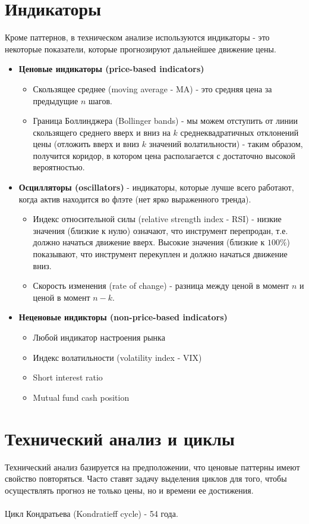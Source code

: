\documentclass{article}
\begin{document}
\section{Индикаторы}
Кроме паттернов, в техническом анализе используются индикаторы - это некоторые показатели, которые прогнозируют дальнейшее движение цены.
\begin{itemize}
    \item \textbf{Ценовые индикаторы (price-based indicators)}
    \begin{itemize}
        \item Скользящее среднее (moving average - MA) - это средняя цена за предыдущие $n$ шагов.
        \item Граница Боллинджера (Bollinger bands) - мы можем отступить от линии скользящего среднего вверх и вниз на $k$ среднеквадратичных отклонений цены (отложить вверх и вниз $k$ значений волатильности) - таким образом, получится коридор, в котором цена располагается с достаточно высокой вероятностью.
    \end{itemize}
    \item \textbf{Осцилляторы (oscillators)} - индикаторы, которые лучше всего работают, когда актив находится во флэте (нет ярко выраженного тренда).
    \begin{itemize}
        \item Индекс относительной силы (relative strength index - RSI) - низкие значения (близкие к нулю) означают, что инструмент перепродан, т.е. должно начаться движение вверх. Высокие значения (близкие к $100\%$) показывают, что инструмент перекуплен и должно начаться движение вниз.
        \item Скорость изменения (rate of change) - разница между ценой в момент $n$ и ценой в момент $n - k$.
    \end{itemize}
    \item \textbf{Неценовые индикторы (non-price-based indicators)}
    \begin{itemize}
        \item Любой индикатор настроения рынка
        \item Индекс волатильности (volatility index - VIX)
        \item Short interest ratio
        \item Mutual fund cash position
    \end{itemize}
\end{itemize}
\section{Технический анализ и циклы}
Технический анализ базируется на предположении, что ценовые паттерны имеют свойство повторяться. Часто ставят задачу выделения циклов для того, чтобы осуществлять прогноз не только цены, но и времени ее достижения.\\\\
Цикл Кондратьева (Kondratieff cycle) - 54 года.
\end{document}
